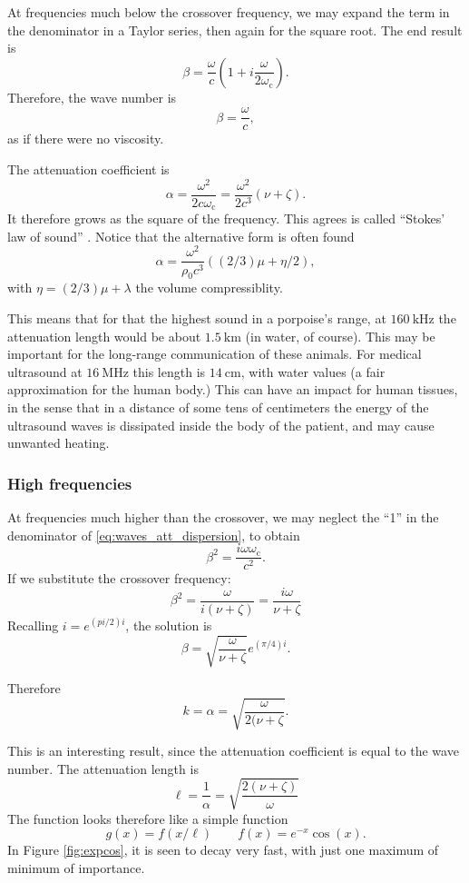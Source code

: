 At frequencies much below the crossover frequency, we may expand the
term in the denominator in a Taylor series, then again for the square
root. The end result is
\[
\beta = \frac{\omega}{c} \left(1 + i   \frac{\omega}{2 \omega_\mathrm{c}}\right).
\]
%
Therefore, the wave number is
\[
\beta = \frac{\omega}{c},
\]
as if there were no viscosity.

The attenuation coefficient is
\[ \alpha = \frac{\omega^2}{2 c\omega_\mathrm{c}}=
\frac{\omega^2}{2 c^3}(\nu+\zeta). \]
%
It therefore grows as the square of the frequency.  This agrees is
called ``Stokes' law of sound'' . Notice
that the alternative form is often found \cite{kp:SloS}
\[
  \alpha =  \frac{\omega^2}{\rho_0 c^3}((2/3) \mu+\eta /2 ),
\]
with $\eta= (2/3) \mu + \lambda$ the volume compressiblity.

This means that for that the highest sound in a porpoise's range, at
$\SI{160}{\kilo\hertz}$ the attenuation length would be about
$\SI{1.5}{\kilo\meter}$ (in water, of course). This may be important
for the long-range communication of these animals. For medical
ultrasound at $\SI{16}{\mega\hertz}$ this length is
$\SI{14}{\centi\meter}$, with water values (a fair approximation for
the human body.) This can have an impact for human tissues, in the
sense that in a distance of some tens of centimeters the energy of the
ultrasound waves is dissipated inside the body of the patient, and may
cause unwanted heating.

\subsubsection{High frequencies}

At frequencies much higher than the crossover, we may neglect the
``1'' in the denominator of \ref{eq:waves_att_dispersion}, to obtain
\[
\beta^2 = \frac{i \omega\omega_\mathrm{c}}{c^2} .
\]
If we substitute the crossover frequency:
\[
\beta^2 = \frac{\omega}{i(\nu+\zeta)} =\frac{i \omega}{\nu+\zeta} 
\]
Recalling $i = e^{(pi/2)i} $, the solution is
\[
\beta =\sqrt{ \frac{\omega}{ \nu + \zeta }} e^{(\pi/4)i}.
\]

Therefore
\[
k=\alpha =\sqrt{\frac{\omega}{ 2 (\nu+ \zeta}}.
\]

This is an interesting result, since the attenuation coefficient is
equal to the wave number. The attenuation length is
\[
\ell= \frac{1}{\alpha}=\sqrt{\frac{ 2 (\nu+ \zeta)}{\omega}}
\]
The function looks therefore like a simple function
\[
g(x)= f(x/\ell) \qquad  f(x) = e^{-x}\cos(x) .
\]
In Figure \ref{fig:expcos}, it is seen to decay very fast, with just
one maximum of minimum of importance.



